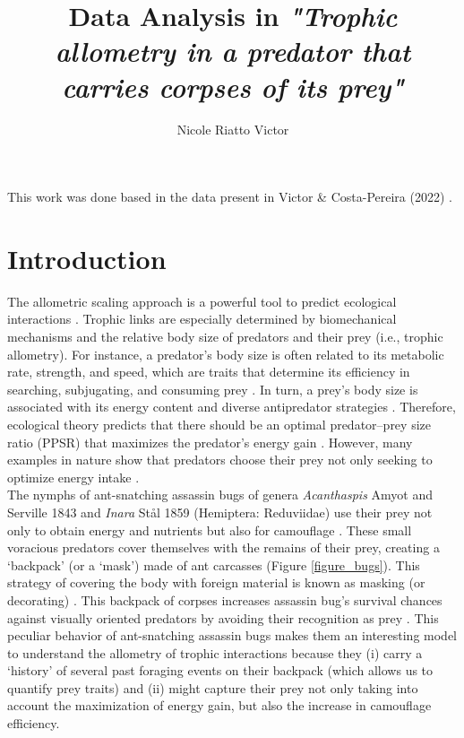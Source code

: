 \documentclass{article}
\title{Data Analysis in \textit{"Trophic allometry in a predator that carries corpses of its prey"}}
\author{Nicole Riatto Victor}
\date{}
\begin{document}
\maketitle

This work was done based in the data present in Victor \& Costa-Pereira (2022) \cite{victor2022trophic}.

\section{Introduction}

The allometric scaling approach is a powerful tool to predict ecological interactions \cite{garlaschelli2003universal}. Trophic links are especially determined by biomechanical mechanisms and the relative body size of predators and their prey (i.e., trophic allometry). For instance, a predator's body size is often related to its metabolic rate, strength, and speed, which are traits that determine its efficiency in searching, subjugating, and consuming prey \cite{wootton2021towards}. In turn, a prey's body size is associated with its energy content and diverse antipredator strategies \cite{portalier2019mechanics}. Therefore, ecological theory predicts that there should be an optimal predator–prey size ratio (PPSR) that maximizes the predator's energy gain \cite{griffiths1980foraging}. However, many examples in nature show that predators choose their prey not only seeking to optimize energy intake \cite{paine1966food}.
\\

The nymphs of ant-snatching assassin bugs of genera \textit{Acanthaspis} Amyot and Serville 1843 and \textit{Inara} Stål 1859 (Hemiptera: Reduviidae) use their prey not only to obtain energy and nutrients but also for camouflage \cite{jackson2007bugs,odhiambo1958some}. These small voracious predators cover themselves with the remains of their prey, creating a ‘backpack’ (or a ‘mask’) made of ant carcasses (Figure \ref{figure_bugs}). This strategy of covering the body with foreign material is known as masking (or decorating) \cite{ruxton2015evolutionary}. This backpack of corpses increases assassin bug's survival chances against visually oriented predators by avoiding their recognition as prey \cite{brandt2002bugs,jackson2007bugs}. This peculiar behavior of ant-snatching assassin bugs makes them an interesting model to understand the allometry of trophic interactions because they (i) carry a ‘history’ of several past foraging events on their backpack (which allows us to quantify prey traits) and (ii) might capture their prey not only taking into account the maximization of energy gain, but also the increase in camouflage efficiency.
\\
\end{document}
